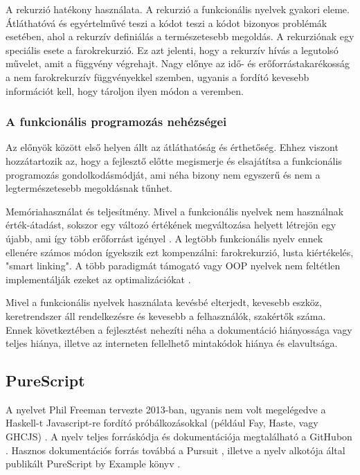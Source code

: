 \documentclass[12pt]{article}
\begin{document}
A rekurzió hatékony használata. A rekurzió a funkcionális nyelvek gyakori eleme. Átláthatóvá és egyértelművé teszi a kódot teszi a kódot bizonyos problémák esetében, ahol a rekurzív definiálás a természetesebb megoldás. A rekurziónak egy speciális esete a farokrekurzió. Ez azt jelenti, hogy a rekurzív hívás a legutolsó művelet, amit a függvény végrehajt. Nagy előnye az idő- és erőforrástakarékosság a nem farokrekurzív függvényekkel szemben, ugyanis a fordító kevesebb információt kell, hogy tároljon ilyen módon a veremben.

\subsubsection{A funkcionális programozás nehézségei}

Az előnyök között első helyen állt az átláthatóság és érthetőség. Ehhez viszont hozzátartozik az, hogy a fejlesztő előtte megismerje és elsajátítsa a funkcionális programozás gondolkodásmódját, ami néha bizony nem egyszerű és nem a legtermészetesebb megoldásnak tűnhet.

Memóriahasználat és teljesítmény. Mivel a funkcionális nyelvek nem használnak érték-átadást, sokszor egy változó értékének megváltozása helyett létrejön egy újabb, ami így több erőforrást igényel \cite{JN}. A legtöbb funkcionális nyelv ennek ellenére számos módon ígyekszik ezt kompenzálni: farokrekurzió, lusta kiértékelés, "smart linking". A több paradigmát támogató vagy OOP nyelvek nem feltétlen implementálják ezeket az optimalizációkat \cite{JN}.

Mivel a funkcionális nyelvek használata kevésbé elterjedt, kevesebb eszköz, keretrendszer áll rendelkezésre és kevesebb a felhasználók, szakértők száma. Ennek következtében a fejlesztést nehezíti néha a dokumentáció hiányossága vagy teljes hiánya, illetve az interneten fellelhető mintakódok hiánya és elavultsága.

\subsection{PureScript}

A nyelvet Phil Freeman tervezte 2013-ban, ugyanis nem volt megelégedve a Haskell-t Javascript-re fordító próbálkozásokkal (például Fay, Haste, vagy GHCJS) \cite{pd}. A nyelv teljes forráskódja és dokumentációja megtalálható a GitHubon \cite{pgit}. Hasznos dokumentációs forrás továbbá a Pursuit \cite{purs}, illetve a nyelv alkotója által publikált PureScript by Example könyv \cite{PE}.
\end{document}
